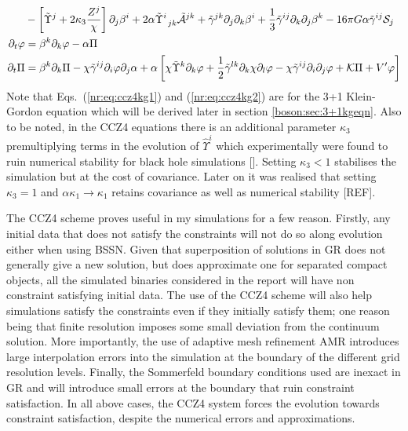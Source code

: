 \begin{align}
& -\left[ \tilde{\Upsilon}^j + 2\kappa_3 \frac{Z^j}{\chi}\right]\partial_j \beta^i + 2\alpha \tilde{\Upsilon}^i_{\,\,\,jk}\tilde{\mathcal{A}}^{jk} + \tilde{\gamma}^{jk}\partial_j\partial_k \beta^i + \frac{1}{3} \tilde{\gamma}^{ij}\partial_k \partial_j \beta^k - 16\pi G \alpha \tilde{\gamma}^{ij}\mathcal{S}_j \\
\partial_t \varphi &= \beta^k\partial_k \varphi - \alpha\Pi \label{nr:eq:ccz4kg1}\\
\partial_t \Pi &= \beta^k\partial_k\Pi -\chi \tilde{\gamma}^{ij}\partial_i \varphi \partial_j \alpha + \alpha \left[ \chi \tilde{\Upsilon}^k\partial_k \varphi+\frac{1}{2} \tilde{\gamma}^{lk}\partial_k\chi\partial_l\varphi  - \chi \tilde{\gamma}^{ij}\partial_i \partial_j \varphi + \mathcal{K} \Pi + V' \varphi \right]\label{nr:eq:ccz4kg2}\end{align}
Note that Eqs.~(\ref{nr:eq:ccz4kg1}) and (\ref{nr:eq:ccz4kg2}) are for the 3+1 Klein-Gordon equation which will be derived later in section \ref{boson:sec:3+1kgeqn}. Also to be noted, in the CCZ4 equations there is an additional parameter $\kappa_3$ premultiplying terms in the evolution of $\hat{\Upsilon}^i$ which experimentally were found to ruin numerical stability for black hole simulations []. Setting $\kappa_3<1$ stabilises the simulation but at the cost of covariance. Later on it was realised that setting $\kappa_3=1$ and $\alpha\kappa_1\rightarrow\kappa_1$ retains covariance as well as numerical stability [REF].



The CCZ4 scheme proves useful in my simulations for a few reason. Firstly, any initial data that does not satisfy the constraints will not do so along evolution either when using BSSN. Given that superposition of solutions in GR does not generally give a new solution, but does approximate one for separated compact objects, all the simulated binaries considered in the report will have non constraint satisfying initial data. The use of the CCZ4 scheme will also help simulations satisfy the constraints even if they initially satisfy them; one reason being that finite resolution imposes some small deviation from the continuum solution. More importantly, the use of adaptive mesh refinement AMR introduces large interpolation errors into the simulation at the boundary of the different grid resolution levels. Finally, the Sommerfeld boundary conditions used are inexact in GR and will introduce small errors at the boundary that ruin constraint satisfaction. In all above cases, the CCZ4 system forces the evolution towards constraint satisfaction, despite the numerical errors and approximations.


